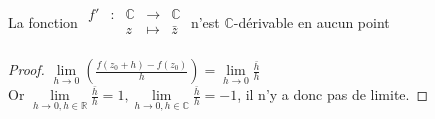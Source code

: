 \documentclass[]{report}
\begin{document}
\begin{prop}La fonction $\begin{array}{ccccc}
f' & : & \mathbb{C} & \to & \mathbb{C} \\
 & & z & \mapsto & \bar{z} \\
\end{array}$ n'est $\mathbb{C}$-dérivable en aucun point
\end{prop}

\begin{proof} $\lim\limits_{h \to 0} \left(\frac{f(z_0+h)-f(z_0)}{h}\right)=\lim\limits_{h \to 0} \frac{\bar{h}}{h}$\\
Or $\lim\limits_{h \to 0,h\in \mathbb{R}} \frac{\bar{h}}{h}=1,\lim\limits_{h \to 0,h\in \mathbb{C}} \frac{\bar{h}}{h}=-1 $, il n'y a donc pas de limite.
\end{proof}
\end{document}
